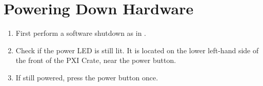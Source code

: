 \section{Powering Down Hardware}
\label{sec:op_pxi:poweroff}
\begin{enumerate}
\item First perform a software shutdown as in .
\item Check if the power LED is still lit.  It is located on the lower left-hand side of the front of the PXI Crate, near the power button.
\item If still powered, press the power button once.
\end{enumerate}


